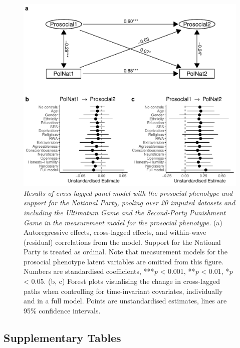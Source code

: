 \documentclass[
  man,floatsintext]{apa6}
\begin{document}
\begin{figure}
\centering
\includegraphics{manuscript_files/figure-latex/clpmPlotPolNatdMFull-1.pdf}
\caption{\label{fig:clpmPlotPolNatdMFull}\emph{Results of cross-lagged panel model with the
prosocial phenotype and support for the National Party, pooling over 20
imputed datasets and including the Ultimatum Game and the Second-Party
Punishment Game in the measurement model for the prosocial phenotype.} (a)
Autoregressive effects, cross-lagged effects, and within-wave (residual)
correlations from the model. Support for the National Party is treated as
ordinal. Note that measurement models for the prosocial phenotype latent
variables are omitted from this figure. Numbers are standardised coefficients,
***\emph{p} \textless{} 0.001, **\emph{p} \textless{} 0.01, *\emph{p} \textless{} 0.05. (b, c) Forest plots visualising
the change in cross-lagged paths when controlling for time-invariant covariates,
individually and in a full model. Points are unstandardised estimates, lines are
95\% confidence intervals.}
\end{figure}

\newpage

\hypertarget{supplementary-tables}{%
\subsection{Supplementary Tables}\label{supplementary-tables}}
\end{document}
